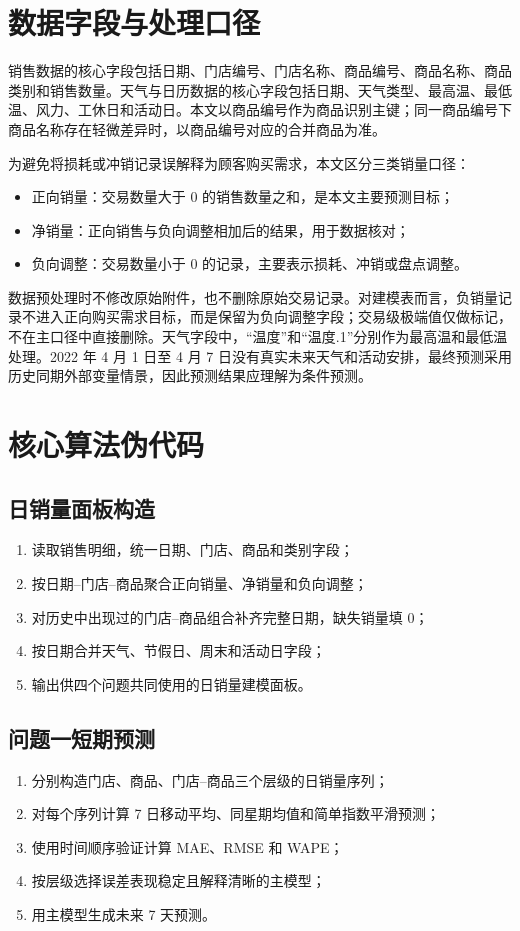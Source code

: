 \appendix

\section{数据字段与处理口径}

销售数据的核心字段包括日期、门店编号、门店名称、商品编号、商品名称、商品类别和销售数量。天气与日历数据的核心字段包括日期、天气类型、最高温、最低温、风力、工休日和活动日。本文以商品编号作为商品识别主键；同一商品编号下商品名称存在轻微差异时，以商品编号对应的合并商品为准。

为避免将损耗或冲销记录误解释为顾客购买需求，本文区分三类销量口径：
\begin{itemize}
  \item 正向销量：交易数量大于 0 的销售数量之和，是本文主要预测目标；
  \item 净销量：正向销售与负向调整相加后的结果，用于数据核对；
  \item 负向调整：交易数量小于 0 的记录，主要表示损耗、冲销或盘点调整。
\end{itemize}

数据预处理时不修改原始附件，也不删除原始交易记录。对建模表而言，负销量记录不进入正向购买需求目标，而是保留为负向调整字段；交易级极端值仅做标记，不在主口径中直接删除。天气字段中，“温度”和“温度.1”分别作为最高温和最低温处理。2022 年 4 月 1 日至 4 月 7 日没有真实未来天气和活动安排，最终预测采用历史同期外部变量情景，因此预测结果应理解为条件预测。

\section{核心算法伪代码}

\subsection{日销量面板构造}
\begin{enumerate}
  \item 读取销售明细，统一日期、门店、商品和类别字段；
  \item 按日期--门店--商品聚合正向销量、净销量和负向调整；
  \item 对历史中出现过的门店--商品组合补齐完整日期，缺失销量填 0；
  \item 按日期合并天气、节假日、周末和活动日字段；
  \item 输出供四个问题共同使用的日销量建模面板。
\end{enumerate}

\subsection{问题一短期预测}
\begin{enumerate}
  \item 分别构造门店、商品、门店--商品三个层级的日销量序列；
  \item 对每个序列计算 7 日移动平均、同星期均值和简单指数平滑预测；
  \item 使用时间顺序验证计算 MAE、RMSE 和 WAPE；
  \item 按层级选择误差表现稳定且解释清晰的主模型；
  \item 用主模型生成未来 7 天预测。
\end{enumerate}

